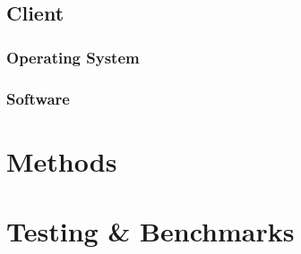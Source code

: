 
\section{Client}
\subsection{Operating System}

\subsection{Software}

\chapter{Methods}

\chapter{Testing \& Benchmarks}

